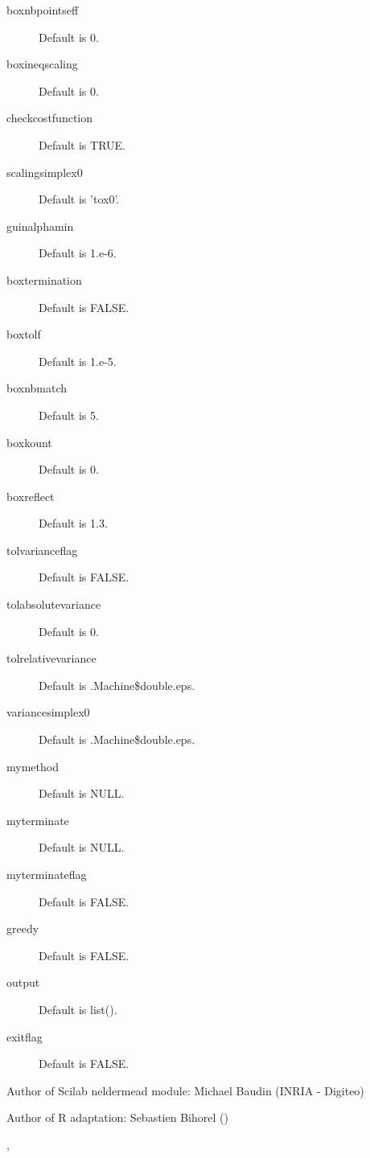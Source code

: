 \begin{Value}
\begin{description}
\item[boxnbpointseff] Default is 0.
\item[boxineqscaling] Default is 0.
\item[checkcostfunction] Default is TRUE.
\item[scalingsimplex0] Default is 'tox0'.
\item[guinalphamin] Default is 1.e-6.
\item[boxtermination] Default is FALSE.
\item[boxtolf] Default is 1.e-5.
\item[boxnbmatch] Default is 5.
\item[boxkount] Default is 0.
\item[boxreflect] Default is 1.3.
\item[tolvarianceflag] Default is FALSE.
\item[tolabsolutevariance] Default is 0.
\item[tolrelativevariance] Default is .Machine\$double.eps.
\item[variancesimplex0] Default is .Machine\$double.eps.
\item[mymethod] Default is NULL.
\item[myterminate] Default is NULL.
\item[myterminateflag] Default is FALSE.
\item[greedy] Default is FALSE.
\item[output] Default is list().
\item[exitflag] Default is FALSE.

\end{description}

\end{Value}
%
\begin{Author}\relax
Author of Scilab neldermead module: Michael Baudin (INRIA - Digiteo)

Author of R adaptation: Sebastien Bihorel ()
\end{Author}
%
\begin{SeeAlso}\relax
{},
\end{SeeAlso}
